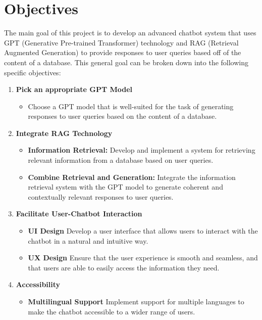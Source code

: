 \documentclass[a4paper,12pt,twoside]{ThesisStyle}
\begin{document}
\section{Objectives}

The main goal of this project is to develop an advanced chatbot system that uses GPT (Generative Pre-trained Transformer) technology and RAG (Retrieval Augmented Generation) to provide responses to user queries based off of the content of a database. This general goal can be broken down into the following specific objectives:

\begin{enumerate}
  \item \textbf{Pick an appropriate GPT Model}
        \begin{itemize}
          \item Choose a GPT model that is well-suited for the task of generating responses to user queries based on the content of a database.
        \end{itemize}
  \item \textbf{Integrate RAG Technology}
        \begin{itemize}
          \item \textbf{Information Retrieval:} Develop and implement a system for retrieving relevant information from a database based on user queries.
          \item \textbf{Combine Retrieval and Generation:} Integrate the information retrieval system with the GPT model to generate coherent and contextually relevant responses to user queries.
        \end{itemize}
  \item \textbf{Facilitate User-Chatbot Interaction}
        \begin{itemize}
          \item \textbf{UI Design} Develop a user interface that allows users to interact with the chatbot in a natural and intuitive way.
          \item \textbf{UX Design} Ensure that the user experience is smooth and seamless, and that users are able to easily access the information they need.
        \end{itemize}
  \item \textbf{Accessibility}
        \begin{itemize}
          \item \textbf{Multilingual Support} Implement support for multiple languages to make the chatbot accessible to a wider range of users.

\end{itemize}
\end{enumerate}
\end{document}

